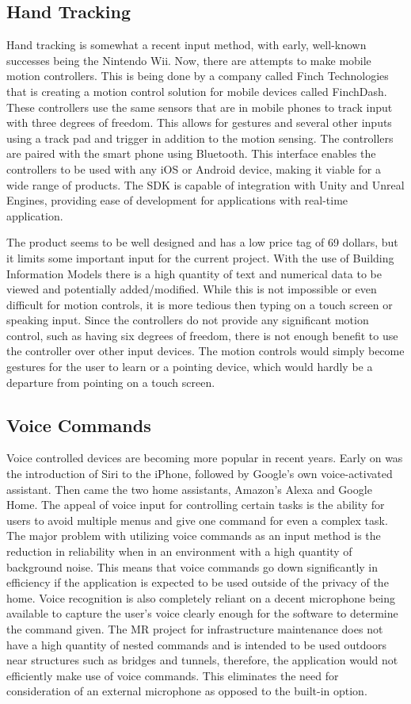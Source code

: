 \documentclass[10pt,draftclsnofoot,onecolumn,letterpaper]{IEEEtran}
\begin{document}
\subsection{Hand Tracking}
Hand tracking is somewhat a recent input method, with early, well-known successes being the Nintendo Wii. Now, there are attempts to make mobile motion controllers. This is being done by a company called Finch Technologies that is creating a motion control solution for mobile devices called FinchDash. These controllers use the same sensors that are in mobile phones to track input with three degrees of freedom. This allows for gestures and several other inputs using a track pad and trigger in addition to the motion sensing. The controllers are paired with the smart phone using Bluetooth. This interface enables the controllers to be used with any iOS or Android device, making it viable for a wide range of products. The SDK is capable of integration with Unity and Unreal Engines, providing ease of development for applications with real-time application\cite{FD}.\par
The product seems to be well designed and has a low price tag of 69 dollars, but it limits some important input for the current project. With the use of Building Information Models there is a high quantity of text and numerical data to be viewed and potentially added/modified. While this is not impossible or even difficult for motion controls, it is more tedious then typing on a touch screen or speaking input. Since the controllers do not provide any significant motion control, such as having six degrees of freedom, there is not enough benefit to use the controller over other input devices. The motion controls would simply become gestures for the user to learn or a pointing device, which would hardly be a departure from pointing on a touch screen.

\subsection{Voice Commands}
Voice controlled devices are becoming more popular in recent years. Early on was the introduction of Siri to the iPhone, followed by Google's own voice-activated assistant. Then came the two home assistants, Amazon's Alexa and Google Home. The appeal of voice input for controlling certain tasks is the ability for users to avoid multiple menus and give one command for even a complex task. The major problem with utilizing voice commands as an input method is the reduction in reliability when in an environment with a high quantity of background noise\cite{MRInput}. This means that voice commands go down significantly in efficiency if the application is expected to be used outside of the privacy of the home. Voice recognition is also completely reliant on a decent microphone being available to capture the user's voice clearly enough for the software to determine the command given. The MR project for infrastructure maintenance does not have a high quantity of nested commands and is intended to be used outdoors near structures such as bridges and tunnels, therefore, the application would not efficiently make use of voice commands. This eliminates the need for consideration of an external microphone as opposed to the built-in option.
\end{document}

